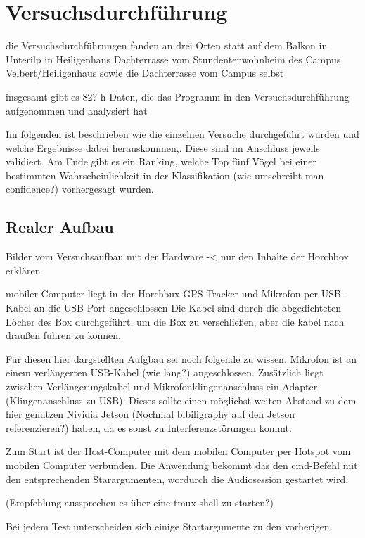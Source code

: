 \section{Versuchsdurchführung}
\label{sec:versuchsdurchfuehrung}

die Versuchsdurchführungen fanden an drei Orten statt
auf dem Balkon in Unterilp in Heiligenhaus
Dachterrasse vom Stundentenwohnheim des Campus Velbert/Heiligenhaus sowie die Dachterrasse vom Campus selbst

insgesamt gibt es 82? h Daten, die das Programm in den Versuchsdurchführung aufgenommen und analysiert hat

Im folgenden ist beschrieben wie die einzelnen Versuche durchgeführt wurden und welche Ergebnisse dabei herauskommen,. Diese sind im Anschluss jeweils validiert. Am Ende gibt es ein Ranking, welche Top fünf Vögel bei einer bestimmten Wahrscheinlichkeit in der Klassifikation (wie umschreibt man confidence?) vorhergesagt wurden.


\subsection{Realer Aufbau}

Bilder vom Versuchsaufbau mit der Hardware -< nur den Inhalte der Horchbox erklären

mobiler Computer liegt in der Horchbux
GPS-Tracker und Mikrofon per USB-Kabel an die USB-Port angeschlossen
Die Kabel sind durch die abgedichteten Löcher des Box durchgeführt, um die Box zu verschließen, aber die kabel nach draußen führen zu können.

Für diesen hier dargstellten Aufgbau sei noch folgende zu wissen.
Mikrofon ist an einem verlängerten USB-Kabel (wie lang?) angeschlossen. Zusätzlich liegt zwischen Verlängerungskabel und Mikrofonklingenanschluss ein Adapter (Klingenanschluss zu USB). Dieses sollte einen möglichst weiten Abstand zu dem hier genutzen Nividia Jetson (Nochmal bibiligraphy auf den Jetson referenzieren?) haben, da es sonst zu Interferenzstörungen kommt.


Zum Start ist der Host-Computer mit dem mobilen Computer per Hotspot vom mobilen Computer verbunden. Die Anwendung bekommt das den cmd-Befehl mit den entsprechenden Starargumenten, wordurch die Audiosession gestartet wird.

(Empfehlung aussprechen es über eine tmux shell zu starten?)

Bei jedem Test unterscheiden sich einige Startargumente zu den vorherigen.




